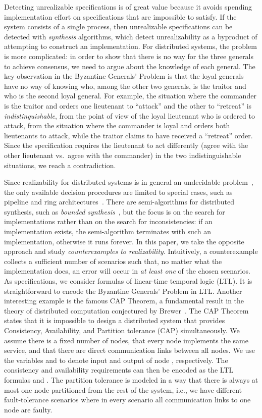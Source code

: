 \documentclass{LMCS}
\theoremstyle{plain}\newtheorem{theorem}[thm]{Theorem}
\theoremstyle{plain}\newtheorem{lemma}[thm]{Lemma}
\theoremstyle{plain}\newtheorem{proposition}[thm]{Proposition}
\theoremstyle{plain}\newtheorem{corollary}[thm]{Corollary}
\theoremstyle{definition}\newtheorem{definition}{Definition}[section]
\begin{document}
Detecting unrealizable specifications is of great value because it avoids spending implementation effort on specifications that are impossible to satisfy. If the system consists of a single process, then unrealizable specifications can be detected with \emph{synthesis} algorithms, which detect unrealizability as a byproduct of attempting to construct an implementation. For distributed systems, the problem is more complicated: in order to show that there is no way for the three generals to achieve consensus, we need to argue about the knowledge of each general. The key observation in the Byzantine Generals' Problem is that the loyal generals have no way of knowing who, among the other two generals, is the traitor and who is the second loyal general. For example, the situation where the commander is the traitor and orders one lieutenant to ``attack'' and the other to ``retreat'' is \emph{indistinguishable}, from the point of view of the loyal lieutenant who is ordered to attack, from the situation where the commander is loyal and orders both lieutenants to attack, while the traitor claims to have received a ``retreat'' order. Since the specification requires the lieutenant to act differently (agree with the other lieutenant vs.\ agree with the commander) in the two indistinguishable situations, we reach a contradiction. 

Since realizability for distributed systems is in general an undecidable problem~\cite{DBLP:conf/focs/PnueliR90}, the only available decision procedures are limited to special cases, such as pipeline and ring architectures~\cite{DBLP:conf/lics/KupfermanV01,DBLP:conf/lics/FinkbeinerS05}. There are semi-algorithms for distributed synthesis, such as \emph{bounded synthesis}~\cite{journals/sttt/FinkbeinerS13}, but the focus is on the search for implementations rather than on the search for inconsistencies: if an implementation exists, the semi-algorithm terminates with such an implementation, otherwise it runs forever.
In this paper, we take the opposite approach and study \emph{counterexamples to realizability}. Intuitively, a counterexample collects a sufficient number of scenarios such that, no matter what the implementation does, an error will occur in \emph{at least one} of the chosen scenarios. As specifications, we consider formulas of linear-time temporal logic (LTL). It is straightforward to encode the Byzantine Generals' Problem in LTL\@.
Another interesting example is the famous CAP Theorem, a fundamental result in the theory of distributed computation conjectured by Brewer~\cite{DBLP:conf/podc/Brewer00}. The CAP Theorem states that it is impossible to design a distributed system that provides Consistency, Availability, and Partition tolerance (CAP) simultaneously.
We assume there is a fixed number  of nodes, that every node implements the same service, and that there are direct communication links between all nodes.
We use the variables  and  to denote input and output of node , respectively.
The consistency and availability requirements can then be encoded as the LTL formulas  and .
The partition tolerance is modeled in a way that there is always at most one node partitioned from the rest of the system, i.e., we have  different fault-tolerance scenarios where in every scenario all communication links to one node are faulty.
\end{document}
